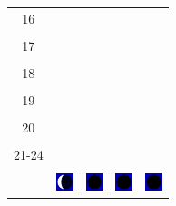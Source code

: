 \documentclass[twoside, a4paper,12pt, tikz]{scrartcl}
\begin{document}
\begin{tabularx}{\linewidth}{|c|X|X|p{2cm}|p{2cm}|}
            &   &       &    &   \\
          \hline
          16&   &                 &    &   \\
            &   &       &    &   \\
          \hline
          17&   &                 &    &   \\
            &   &       &    &   \\
          \hline
          18&   &                 &    &   \\
            &   &       &    &   \\
          \hline
          19&   &                 &     &   \\
            &   &       &    &   \\
          \hline
          20&   &              &    &   \\
            &   &       &    &   \\
          \hline 
          21-24&   &              &    &   \\
            &   &       &    &   \\
          \hline
                      & \vspace{0.01cm} \centerline{\includegraphics[width=0.5cm]{moon_phases/Moon_phase_7.svg.png}} \vspace{0.1cm} & \vspace{0.01cm} \centerline{\includegraphics[width=0.5cm]{moon_phases/Moon_phase_0.svg.png}} \vspace{0.1cm} & \vspace{0.01cm} \centerline{\includegraphics[width=0.5cm]{moon_phases/Moon_phase_0.svg.png}} \vspace{0.1cm} & \vspace{0.01cm} \centerline{\includegraphics[width=0.5cm]{moon_phases/Moon_phase_0.svg.png}} \vspace{0.1cm}\\
          \hline    
        \end{tabularx}

\newpage
\end{document}
